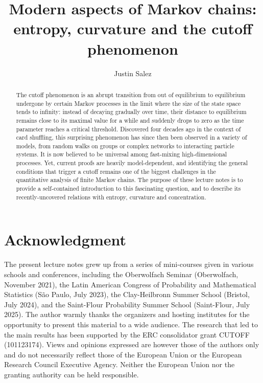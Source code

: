 \documentclass[12pt,final]{article}
\title{Modern aspects of Markov chains:\\entropy, curvature and the cutoff phenomenon}
\author{Justin Salez}
\date{}
\renewcommand{\baselinestretch}{1.3}
\numberwithin{equation}{section}
\begin{document}
\maketitle

\begin{abstract}
The cutoff phenomenon is an abrupt transition from out of equilibrium to equilibrium undergone by certain Markov processes in the limit where the size of the state space tends to infinity: instead of decaying gradually over time, their distance to equilibrium remains close to its maximal value for a while and suddenly drops to zero as the time parameter reaches a critical threshold. Discovered four decades ago in the context of card shuffling, this surprising phenomenon has since then been observed in a variety of models, from random walks on groups or complex networks to interacting particle systems. It is now believed to be universal among fast-mixing high-dimensional processes. Yet, current proofs are heavily model-dependent, and identifying the general conditions that trigger a cutoff remains one of the biggest challenges in the quantitative analysis of finite Markov chains.  The purpose of these lecture notes is to  provide a self-contained introduction to this fascinating question, and to describe its recently-uncovered relations with entropy, curvature and concentration.\end{abstract}
\newpage
\renewcommand{\baselinestretch}{1.26}\normalsize %
{\tableofcontents} %
\renewcommand{\baselinestretch}{1.3}\normalsize %
\newpage
\section*{Acknowledgment}
The present lecture notes grew up from a series of mini-courses given in various  schools and conferences, including the Oberwolfach Seminar (Oberwolfach, November 2021), the  Latin American Congress of Probability and Mathematical Statistics (S\~ao Paulo, July 2023), the Clay-Heilbronn Summer School (Bristol, July 2024), and the Saint-Flour Probability Summer School (Saint-Flour, July 2025). The author warmly thanks the organizers and hosting institutes for the opportunity to present this material to a wide audience. The research that led to the  main results  has been supported by the ERC consolidator grant CUTOFF (101123174). Views and opinions expressed are however those of the authors only and do not necessarily reflect those of the European Union or the European Research Council Executive Agency. Neither the European Union nor the granting authority can be held responsible.
\newpage
\end{document}
